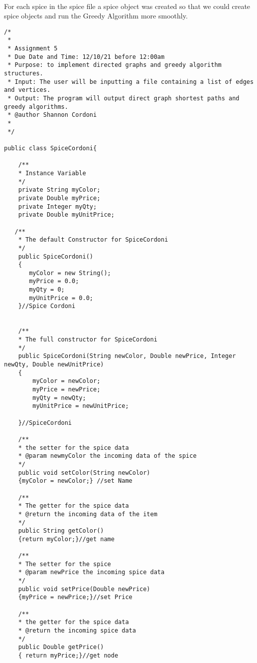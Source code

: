 \documentclass[letterpaper, 10pt,DIV=13]{scrartcl}
\numberwithin{equation}{section} %
\numberwithin{figure}{section} %
\numberwithin{table}{section} %
\begin{document}
\paragraph{} For each spice in the spice file a spice object was created so that we could create spice objects and run the Greedy Algorithm more smoothly.   

\lstset{numbers=left, numberstyle=\tiny, stepnumber=1, numbersep=5pt, basicstyle=\footnotesize\ttfamily}
\begin{lstlisting}[frame=single, ]
/*
 * 
 * Assignment 5
 * Due Date and Time: 12/10/21 before 12:00am 
 * Purpose: to implement directed graphs and greedy algorithm structures.
 * Input: The user will be inputting a file containing a list of edges and vertices. 
 * Output: The program will output direct graph shortest paths and greedy algorithms. 
 * @author Shannon Cordoni 
 * 
 */

public class SpiceCordoni{

    /**
    * Instance Variable 
    */
    private String myColor;
    private Double myPrice;
    private Integer myQty;
    private Double myUnitPrice;
   
   /**
    * The default Constructor for SpiceCordoni
    */
    public SpiceCordoni()
    {
       myColor = new String();
       myPrice = 0.0;
       myQty = 0;
       myUnitPrice = 0.0;
    }//Spice Cordoni
   

    /**
    * The full constructor for SpiceCordoni
    */
    public SpiceCordoni(String newColor, Double newPrice, Integer newQty, Double newUnitPrice)
    {
        myColor = newColor;
        myPrice = newPrice;
        myQty = newQty;
        myUnitPrice = newUnitPrice;
        
    }//SpiceCordoni

    /**
    * the setter for the spice data
    * @param newmyColor the incoming data of the spice
    */
    public void setColor(String newColor)
    {myColor = newColor;} //set Name

    /**
    * The getter for the spice data
    * @return the incoming data of the item
    */
    public String getColor()
    {return myColor;}//get name

    /**
    * The setter for the spice
    * @param newPrice the incoming spice data
    */
    public void setPrice(Double newPrice)
    {myPrice = newPrice;}//set Price

    /**
    * the getter for the spice data
    * @return the incoming spice data
    */
    public Double getPrice()
    { return myPrice;}//get node


\end{lstlisting}
\end{document}
